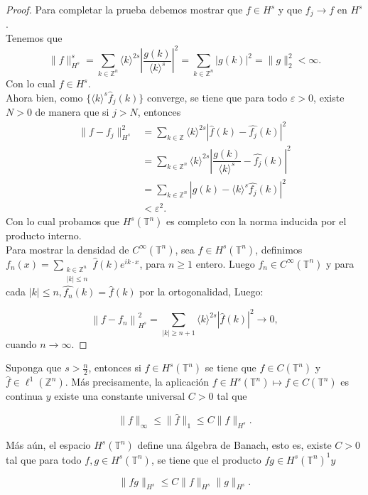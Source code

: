 \documentclass[12pt]{article}
\newcommand\Z{\ensuremath{\mathbb{Z}}}
\newcommand\T{\mathbb{T}}
\renewcommand{\epsilon}{\varepsilon}
\renewcommand{\hat}{\widehat}
\begin{document}
\begin{proof}
Para completar la prueba debemos mostrar que $f\in H^{s}$ y que $f_{j}\rightarrow f$ en $H^{s}$.\\
Tenemos que
$$\|f\|^{s}_{H^{s}}=\displaystyle\sum_{k\in \Z ^{n}} \langle k \rangle^{2s}\left| \dfrac{g(k)}{\langle k\rangle^{s}}\right|^{2}=\displaystyle\sum_{k\in \Z^{n}}|g(k)|^{2}=\|g\|^{2}_{2}<\infty.$$
Con lo cual $f\in H^{s}$.\\
Ahora bien, como $\{\langle k \rangle^{s}\widehat{f}_j(k)\}$ converge, se tiene que para todo $\epsilon>0$, existe $N>0$ de manera que si $j>N$, entonces 
\begin{align*}
   \|f-f_j\|_{H^{s}}^{2}&=\sum_{k\in \Z}\langle k \rangle^{2s}|\hat{f}(k)-\hat{f_j}(k)|^{2}\\
   &=\sum_{k\in \Z^{n}} \langle k\rangle^{2s}\left| \dfrac{g(k)}{\langle k \rangle^{s}}-  \hat{f_j}(k) \right|^{2} \\
   &= \sum_{k\in \Z^{n}} \left| g(k)- \langle k\rangle^{s} \hat{f_j}(k) \right|^{2} \\
   &< \epsilon^{2}
.\end{align*}
Con lo cual probamos que $H^{s}(\T^{n})$ es completo con la norma inducida por el producto interno.\\

Para mostrar la densidad de $C^{\infty}(\T^ n)$, sea $f \in H^s(\T^n)$, definimos $\displaystyle f_n(x)=\sum_{\substack{k\in \Z^n\\
|k|\leq n}} \widehat{f}(k) e^{i k \cdot x}$, para $n \geq 1$ entero. Luego $f_n \in C^{\infty}(\T^n)$ y para cada $|k| \leq n, \widehat{f_n}(k)=\widehat{f}(k)$ por la ortogonalidad, Luego:

$$
\left\|f-f_n\right\|_{H^s}^2=\sum_{|k| \geq n+1}\langle k\rangle^{2 s}|\widehat{f}(k)|^2 \rightarrow 0,
$$
cuando  $n\to \infty$.
\end{proof}

\begin{theorem}\label{algebra}
Suponga que $s>\frac{n}{2}$, entonces si $f \in H^s\left(\mathbb{T}^n\right)$ se tiene que $f\in C\left(\mathbb{T}^n\right)$ y $\widehat{f} \in \ell^1\left(\mathbb{Z}^n\right)$. Más precisamente, la aplicación $f \in H^s\left(\mathbb{T}^n\right) \mapsto f \in C\left(\mathbb{T}^n\right)$ es continua $y$ existe una constante universal $C>0$ tal que

$$
\|f\|_{\infty} \leq\|\widehat{f}\|_1 \leq C\|f\|_{H^s}.
$$


Más aún, el espacio $H^s\left(\mathbb{T}^n\right)$ define una álgebra de Banach, esto es, existe $C>0$ tal que para todo $f, g \in H^s\left(\mathbb{T}^n\right)$, se tiene que el producto $f g \in H^s\left(\mathbb{T}^n\right)^1 y$

$$
\|f g\|_{H^s} \leq C\|f\|_{H^s}\|g\|_{H^s}.
$$
\end{theorem}
\end{document}
